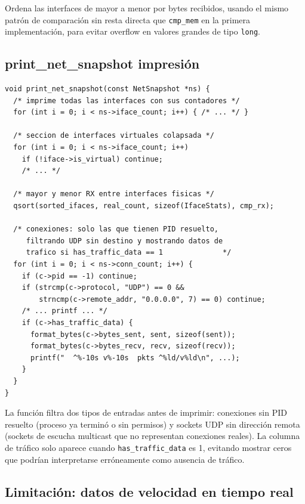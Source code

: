 \documentclass[12pt,letterpaper]{article}
\begin{document}
Ordena las interfaces de mayor a menor por bytes recibidos, usando el mismo patrón de comparación sin resta
directa que \texttt{cmp\_mem} en la primera implementación, para evitar overflow en valores grandes de tipo
\texttt{long}.

\subsection*{print\_net\_snapshot impresión}

\begin{lstlisting}[style=modernc, caption={\texttt{net\_monitor.c} print\_net\_snapshot()503)}]
void print_net_snapshot(const NetSnapshot *ns) {
  /* imprime todas las interfaces con sus contadores */
  for (int i = 0; i < ns->iface_count; i++) { /* ... */ }

  /* seccion de interfaces virtuales colapsada */
  for (int i = 0; i < ns->iface_count; i++)
    if (!iface->is_virtual) continue;
    /* ... */

  /* mayor y menor RX entre interfaces fisicas */
  qsort(sorted_ifaces, real_count, sizeof(IfaceStats), cmp_rx);

  /* conexiones: solo las que tienen PID resuelto,
     filtrando UDP sin destino y mostrando datos de
     trafico si has_traffic_data == 1              */
  for (int i = 0; i < ns->conn_count; i++) {
    if (c->pid == -1) continue;
    if (strcmp(c->protocol, "UDP") == 0 &&
        strncmp(c->remote_addr, "0.0.0.0", 7) == 0) continue;
    /* ... printf ... */
    if (c->has_traffic_data) {
      format_bytes(c->bytes_sent, sent, sizeof(sent));
      format_bytes(c->bytes_recv, recv, sizeof(recv));
      printf("  ^%-10s v%-10s  pkts ^%ld/v%ld\n", ...);
    }
  }
}
\end{lstlisting}

La función filtra dos tipos de entradas antes de imprimir: conexiones sin PID resuelto (proceso ya terminó o
sin permisos) y sockets UDP sin dirección remota (sockets de escucha multicast que no representan conexiones
reales). La columna de tráfico solo aparece cuando \texttt{has\_traffic\_data} es 1, evitando mostrar ceros que
podrían interpretarse erróneamente como ausencia de tráfico.

\subsection*{Limitación: datos de velocidad en tiempo real}
\end{document}
